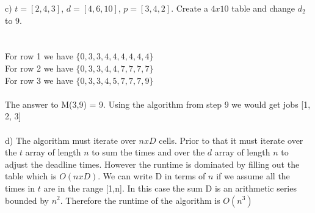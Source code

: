 \documentclass{article}
\begin{document}
c) $t=[2, 4, 3]$, $d=[4, 6, 10]$, $p=[3, 4, 2]$. Create a $4x10$ table and change $d_2$ to 9.\\\\\\
For row 1 we have $\{0,3,3,4,4,4,4,4,4\}$\\
For row 2 we have $\{0,3,3,4,4,7,7,7,7\}$\\
For row 3 we have $\{0,3,3,4,5,7,7,7,9\}$\\\\
The answer to M(3,9) = 9.  Using the algorithm from step 9 we would get jobs [1, 2, 3]\\\\
d) The algorithm must iterate over $nxD$ cells. Prior to that it must iterate over the $t$ array of length $n$ to sum the times and over the $d$ array of length $n$ to adjust the deadline times.  However the runtime is dominated by filling out the table which is $O(nxD)$.  We can write D in terms of $n$ if we assume all the times in $t$ are in the range [1,n]. In this case the sum D is an arithmetic series bounded by $n^2$.  Therefore the runtime of the algorithm is $O(n^3)$
\end{document}
